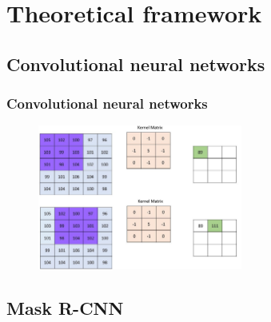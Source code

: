 \documentclass{beamer}
\begin{document}

\section{Theoretical framework}

\subsection{Convolutional neural networks} %


\begin{frame}

\frametitle{Convolutional neural networks}

\begin{figure}[ht]
	\includegraphics[width=0.6\textwidth]{pictures/conv.jpg}
\end{figure}


\end{frame}


\subsection{Mask R-CNN}
\end{document}
